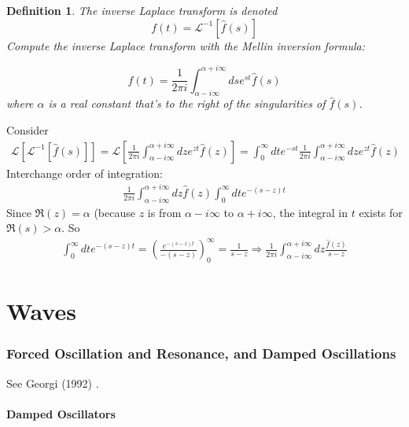 \documentclass[10pt]{amsart}
\newtheorem{definition}{Definition}
\begin{document}
\begin{multicols*}{2}
\begin{definition}
The inverse Laplace transform is denoted
\begin{equation}
f(t) = \mathcal{L}^{-1}[ \widehat{f}(s) ]
\end{equation}
Compute the inverse Laplace transform with the Mellin inversion formula:

\begin{equation}
f(t) = \frac{1}{2\pi i} \int_{\alpha - i \infty}^{\alpha + i \infty} ds e^{st} \widehat{f}(s)
\end{equation}
where $\alpha$ is a real constant that's to the right of the singularities of $\widehat{f}(s)$.
\end{definition}

Consider 
\[
\begin{gathered}
\mathcal{L} [ \mathcal{L}^{-1} [\widehat{f}(s)] ] =  \mathcal{L} \left[ \frac{1}{2\pi i} \int_{\alpha - i \infty}^{\alpha + i \infty} dz e^{zt} \widehat{f}(z) \right] = \int_0^{\infty} dt e^{-st} \frac{1}{2\pi i} \int_{\alpha - i \infty}^{\alpha + i \infty} dz e^{zt} \widehat{f}(z)
\end{gathered}
\]
Interchange order of integration:
\[
\begin{gathered}
\frac{1}{2\pi i} \int_{\alpha - i \infty }^{\alpha + i \infty} dz \widehat{f}(z) \int_0^{\infty} dt e^{-(s- z) t}
\end{gathered}
\]
Since $\Re{ (z)} = \alpha$ (because $z$ is from $\alpha - i \infty$ to $\alpha + i \infty$, the integral in $t$ exists for $\Re{ (s)} > \alpha$.
So
\[
\begin{gathered}
\int_0^{\infty} dt e^{-(s-z)t} =  \left( \frac{ e^{-(s-z)t} }{ -(s-z) } \right)_0^{\infty} = \frac{1}{s-z} \Longrightarrow \frac{1}{2 \pi i} \int_{\alpha - i \infty}^{\alpha + i \infty} dz \frac{\widehat{f}(z) }{ s-z}
\end{gathered}
\]

\part{Waves}

\section{Forced Oscillation and Resonance, and Damped Oscillations}

See Georgi (1992) \cite{Geor1992}.

\subsection{Damped Oscillators}


\end{multicols*}
\end{document}
